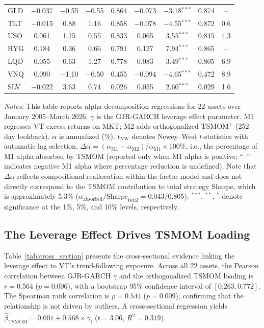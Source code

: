 \begin{table}[H]
\begin{threeparttable}
\begin{tabular}{@{}lcccccccc@{}}
GLD & $-$0.037 & $-$0.55 & $-$0.55 & 0.864 & $-$0.073 & $-$3.18$^{***}$ & 0.874 & -- \\
TLT & $-$0.015 & 0.88 & 1.16 & 0.858 & $-$0.078 & $-$4.55$^{***}$ & 0.872 & 0.6 \\
USO & 0.061 & 1.15 & 0.55 & 0.833 & 0.065 & 3.55$^{***}$ & 0.845 & 4.3 \\
HYG & 0.184 & 0.36 & 0.66 & 0.791 & 0.127 & 7.94$^{***}$ & 0.865 & -- \\
LQD & 0.055 & 0.63 & 1.27 & 0.778 & 0.083 & 3.49$^{***}$ & 0.805 & 6.9 \\
VNQ & 0.090 & $-$1.10 & $-$0.50 & 0.455 & $-$0.094 & $-$4.65$^{***}$ & 0.472 & 8.9 \\
SLV & $-$0.022 & 3.63 & 0.74 & 0.026 & 0.055 & 2.60$^{***}$ & 0.029 & 1.6 \\
\bottomrule
\end{tabular}
\begin{tablenotes}
\small
\item \textit{Notes:} This table reports alpha decomposition regressions for 22 assets over January 2005--March 2026. $\gamma$ is the GJR-GARCH leverage effect parameter. M1 regresses VT excess returns on MKT; M2 adds orthogonalized TSMOM$^{\perp}$ (252-day lookback). $\alpha$ is annualized (\%). $t_{\text{NW}}$ denotes Newey--West $t$-statistics with automatic lag selection. $\Delta\alpha = (\alpha_{\text{M1}} - \alpha_{\text{M2}})/\alpha_{\text{M1}} \times 100\%$, i.e., the percentage of M1 alpha absorbed by TSMOM (reported only when M1 alpha is positive; ``--'' indicates negative M1 alpha where percentage reduction is undefined). Note that $\Delta\alpha$ reflects compositional reallocation within the factor model and does not directly correspond to the TSMOM contribution to total strategy Sharpe, which is approximately 5.3\% ($\alpha_{\text{absorbed}}/\text{Sharpe}_{\text{total}} = 0.043/0.805$). $^{***}$, $^{**}$, $^{*}$ denote significance at the 1\%, 5\%, and 10\% levels, respectively.
\end{tablenotes}
\end{threeparttable}
\end{table}


\subsection{The Leverage Effect Drives TSMOM Loading}

Table~\ref{tab:cross_section} presents the cross-sectional evidence linking the leverage effect to VT's trend-following exposure. Across all 22 assets, the Pearson correlation between GJR-GARCH $\gamma$ and the orthogonalized TSMOM loading is $r = 0.564$ ($p = 0.006$), with a bootstrap 95\% confidence interval of $[0.263, 0.772]$. The Spearman rank correlation is $\rho = 0.544$ ($p = 0.009$), confirming that the relationship is not driven by outliers. A cross-sectional regression yields $\hat{\beta}_{\text{TSMOM}}^{\perp} = 0.001 + 0.568 \times \gamma_i$ ($t = 3.06$, $R^2 = 0.319$).

